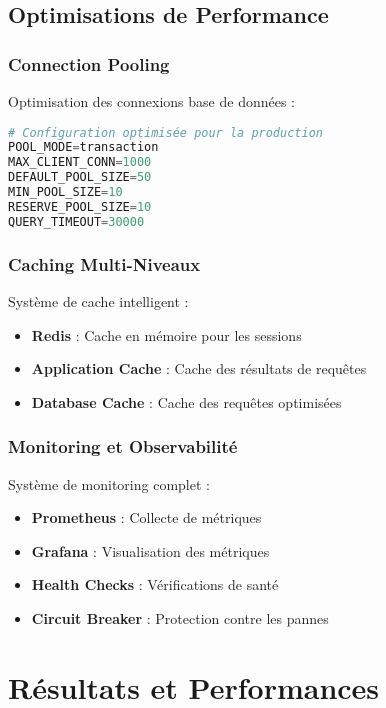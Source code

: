 \documentclass[12pt,a4paper]{article}
\begin{document}
\subsection{Optimisations de Performance}

\subsubsection{Connection Pooling}
Optimisation des connexions base de données :

\begin{lstlisting}[language=Python, caption=Configuration PgBouncer]
# Configuration optimisée pour la production
POOL_MODE=transaction
MAX_CLIENT_CONN=1000
DEFAULT_POOL_SIZE=50
MIN_POOL_SIZE=10
RESERVE_POOL_SIZE=10
QUERY_TIMEOUT=30000
\end{lstlisting}

\subsubsection{Caching Multi-Niveaux}
Système de cache intelligent :

\begin{itemize}
    \item \textbf{Redis} : Cache en mémoire pour les sessions
    \item \textbf{Application Cache} : Cache des résultats de requêtes
    \item \textbf{Database Cache} : Cache des requêtes optimisées
\end{itemize}

\subsubsection{Monitoring et Observabilité}
Système de monitoring complet :

\begin{itemize}
    \item \textbf{Prometheus} : Collecte de métriques
    \item \textbf{Grafana} : Visualisation des métriques
    \item \textbf{Health Checks} : Vérifications de santé
    \item \textbf{Circuit Breaker} : Protection contre les pannes
\end{itemize}

\section{Résultats et Performances}
\end{document}
